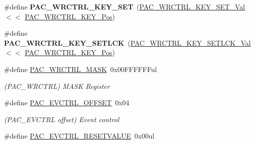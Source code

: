 \begin{DoxyCompactItemize}
\item 
\hypertarget{group___s_a_m_l21___p_a_c_ga9302204a9747a48d927285cc1bdc5b73}{}\#define {\bfseries P\+A\+C\+\_\+\+W\+R\+C\+T\+R\+L\+\_\+\+K\+E\+Y\+\_\+\+S\+E\+T}~(\hyperlink{group___s_a_m_l21___p_a_c_ga4546bc0b91f6f0a0283eb1a9e48c767d}{P\+A\+C\+\_\+\+W\+R\+C\+T\+R\+L\+\_\+\+K\+E\+Y\+\_\+\+S\+E\+T\+\_\+\+Val}        $<$$<$ \hyperlink{group___s_a_m_l21___p_a_c_ga40efb8e0f647731be9f0df54d385282d}{P\+A\+C\+\_\+\+W\+R\+C\+T\+R\+L\+\_\+\+K\+E\+Y\+\_\+\+Pos})\label{group___s_a_m_l21___p_a_c_ga9302204a9747a48d927285cc1bdc5b73}

\item 
\hypertarget{group___s_a_m_l21___p_a_c_ga73300b98c3788b80d5f94de7cfb59e42}{}\#define {\bfseries P\+A\+C\+\_\+\+W\+R\+C\+T\+R\+L\+\_\+\+K\+E\+Y\+\_\+\+S\+E\+T\+L\+C\+K}~(\hyperlink{group___s_a_m_l21___p_a_c_ga743a61ffc754e8f10947372a73e07289}{P\+A\+C\+\_\+\+W\+R\+C\+T\+R\+L\+\_\+\+K\+E\+Y\+\_\+\+S\+E\+T\+L\+C\+K\+\_\+\+Val}     $<$$<$ \hyperlink{group___s_a_m_l21___p_a_c_ga40efb8e0f647731be9f0df54d385282d}{P\+A\+C\+\_\+\+W\+R\+C\+T\+R\+L\+\_\+\+K\+E\+Y\+\_\+\+Pos})\label{group___s_a_m_l21___p_a_c_ga73300b98c3788b80d5f94de7cfb59e42}

\item 
\hypertarget{group___s_a_m_l21___p_a_c_ga20de081af2514eb13d470f89d77999ed}{}\#define \hyperlink{group___s_a_m_l21___p_a_c_ga20de081af2514eb13d470f89d77999ed}{P\+A\+C\+\_\+\+W\+R\+C\+T\+R\+L\+\_\+\+M\+A\+S\+K}~0x00\+F\+F\+F\+F\+F\+Ful\label{group___s_a_m_l21___p_a_c_ga20de081af2514eb13d470f89d77999ed}

\begin{DoxyCompactList}\small\item\em (P\+A\+C\+\_\+\+W\+R\+C\+T\+R\+L) M\+A\+S\+K Register \end{DoxyCompactList}\item 
\hypertarget{group___s_a_m_l21___p_a_c_ga3ff92d7bb0f7e261da7ddb81bbaf900f}{}\#define \hyperlink{group___s_a_m_l21___p_a_c_ga3ff92d7bb0f7e261da7ddb81bbaf900f}{P\+A\+C\+\_\+\+E\+V\+C\+T\+R\+L\+\_\+\+O\+F\+F\+S\+E\+T}~0x04\label{group___s_a_m_l21___p_a_c_ga3ff92d7bb0f7e261da7ddb81bbaf900f}

\begin{DoxyCompactList}\small\item\em (P\+A\+C\+\_\+\+E\+V\+C\+T\+R\+L offset) Event control \end{DoxyCompactList}\item 
\hypertarget{group___s_a_m_l21___p_a_c_gac4be9b5abd80d24d56fac00c9becb708}{}\#define \hyperlink{group___s_a_m_l21___p_a_c_gac4be9b5abd80d24d56fac00c9becb708}{P\+A\+C\+\_\+\+E\+V\+C\+T\+R\+L\+\_\+\+R\+E\+S\+E\+T\+V\+A\+L\+U\+E}~0x00ul\label{group___s_a_m_l21___p_a_c_gac4be9b5abd80d24d56fac00c9becb708}


\end{DoxyCompactItemize}
